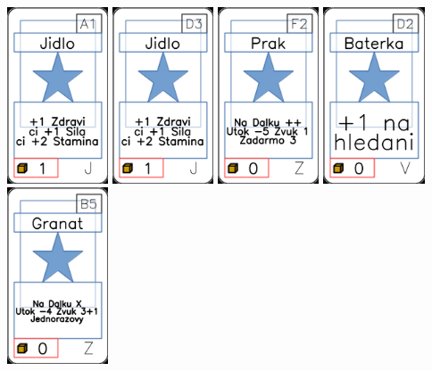 \documentclass[a4paper]{article}
\begin{document}
	\includegraphics[width=3.0cm]{img-1_0}
	\includegraphics[width=3.0cm]{img-1_17}
	\includegraphics[width=3.0cm]{img-1_86}
	\includegraphics[width=3.0cm]{img-1_76}
	\includegraphics[width=3.0cm]{img-1_99}
\end{document}
